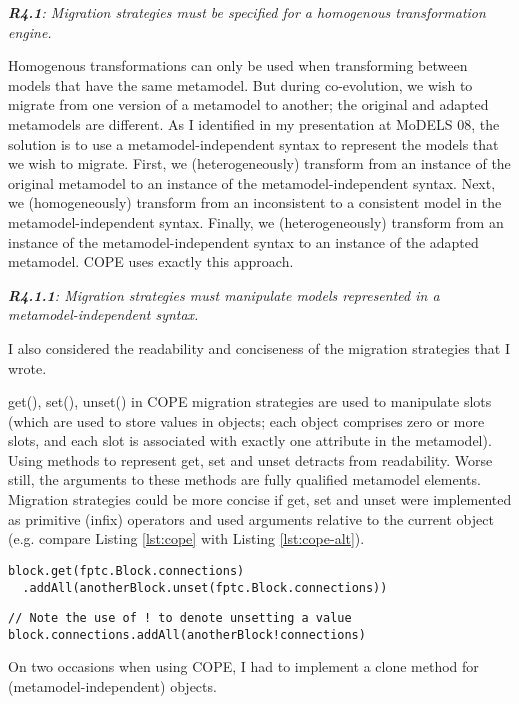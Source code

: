 \documentclass[a4paper]{article}
\begin{document}
\emph{\textbf{R4.1}: Migration strategies must be specified for a homogenous transformation engine.}

Homogenous transformations can only be used when transforming between models that have the same metamodel. But during co-evolution, we wish to migrate from one version of a metamodel to another; the original and adapted metamodels are different. As I identified in my presentation at MoDELS 08, the solution is to use a metamodel-independent syntax to represent the models that we wish to migrate. First, we (heterogeneously) transform from an instance of the original metamodel to an instance of the metamodel-independent syntax. Next, we (homogeneously) transform from an inconsistent to a consistent model in the metamodel-independent syntax. Finally, we (heterogeneously) transform from an instance of the metamodel-independent syntax to an instance of the adapted metamodel. COPE uses exactly this approach.

\emph{\textbf{R4.1.1}: Migration strategies must manipulate models represented in a metamodel-independent syntax.}


I also considered the readability and conciseness of the migration strategies that I wrote.

get(), set(), unset() in COPE migration strategies are used to manipulate slots (which are used to store values in objects; each object comprises zero or more slots, and each slot is associated with exactly one attribute in the metamodel). Using methods to represent get, set and unset detracts from readability. Worse still, the arguments to these methods are fully qualified metamodel elements. Migration strategies could be more concise if get, set and unset were implemented as primitive (infix) operators and used arguments relative to the current object (e.g. compare Listing \ref{lst:cope} with Listing \ref{lst:cope-alt}).

\begin{lstlisting}[caption=Get and unset in COPE migration strategies., label=lst:cope]
block.get(fptc.Block.connections)
  .addAll(anotherBlock.unset(fptc.Block.connections))
\end{lstlisting}

\begin{lstlisting}[caption=Alternative to COPE get and unset., label=lst:cope-alt]
// Note the use of ! to denote unsetting a value
block.connections.addAll(anotherBlock!connections)
\end{lstlisting}

On two occasions when using COPE, I had to implement a clone method for (metamodel-independent) objects.
\end{document}
